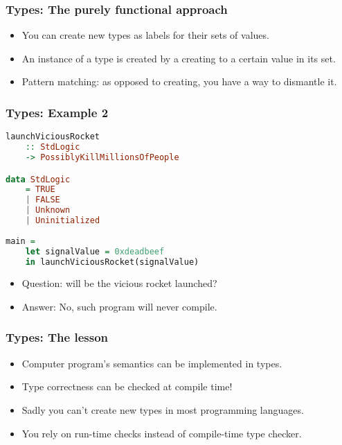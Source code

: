 \documentclass[11pt]{beamer}
\begin{document}
	\begin{frame}
		\frametitle{Types: The purely functional approach}
			\begin{itemize}[<+->]
				\item You can create new types as labels for their sets of values.
				\item An instance of a type is created by a creating to a certain value in its set.
				\item Pattern matching: as opposed to creating, you have a way to dismantle it.
			\end{itemize}
	\end{frame}

\begin{frame}[fragile]
	\frametitle{Types: Example 2}
\begin{lstlisting}[language=haskell]
launchViciousRocket 
    :: StdLogic 
    -> PossiblyKillMillionsOfPeople

data StdLogic
    = TRUE
    | FALSE
    | Unknown
    | Uninitialized
	
main = 
    let signalValue = 0xdeadbeef 
    in launchViciousRocket(signalValue)		
\end{lstlisting}
\begin{itemize}[<+->]
	\item Question: will be the vicious rocket launched?
	\item Answer: No, such program will never compile.
\end{itemize}		
\end{frame}

\begin{frame}
	\frametitle{Types: The lesson}
	\begin{itemize}[<+->]
		\item Computer program's semantics can be implemented in types.
		\item Type correctness can be checked at compile time!
		\item Sadly you can't create new types in most programming languages.
		\item You rely on run-time checks instead of compile-time type checker.
	\end{itemize}	
\end{frame}
\end{document}

